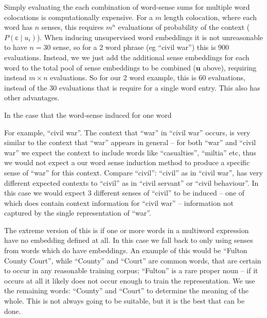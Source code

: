 \documentclass{sig-alternate}
\begin{document}
Simply evaluating the each combination of word-sense sums for multiple word colocations is computationally expensive. For a $m$ length colocation, where each word has $n$ senses, this requires $m^n$ evaluations of probability of the context ($P(\mathbb{c}\mid u_i)$). When inducing unsupervised word embeddings it is not unreasonable to have $n=30$ sense, so for a 2 word phrase (eg ``civil war'') this is 900 evaluations.
Instead, we we just add the additional sense embeddings for each word to the total pool of sense embeddings to be combined ($\mathbf{u}$ above), requiring instead $m \times n$ evaluations. So for our 2 word example, this is 60 evaluations, instead of the 30 evaluations that is require for a single word entry. This also has other advantages.


In the case that the word-sense induced for one word 

For example, ``civil war''. The context that ``war'' in ``civil war'' occurs, is very similar to the context that ``war'' appears in general -- for both ``war'' and ``civil war'' we expect the context to include words like ``casualties'', ``miltia'' etc, thus we would not expect a our word sense induction method to produce a specific sense of ``war'' for this context.
Compare ``civil'': ``civil'' as in ``civil war'', has very different expected contexts to ``civil'' as in ``civil servant'' or ``civil behaviour''. In this case we would expect 3 different senses of ``civil'' to be induced -- one of which does contain context information for ``civil war'' -- information not captured by the single representation of ``war''.

The extreme version of this is if one or more words in a multiword expression have no embedding defined at all. In this case we fall back to only using senses from words which do have embeddings. An example of this would be ``Fulton County Court'', while ``County'' and ``Court'' are common words, that are certain to occur in any reasonable training corpus; ``Fulton'' is a rare proper noun -- if it occurs at all it likely does not occur enough to train the representation. We use the remaining words: ``County'' and ``Court'' to determine the meaning of the whole. This is not always going to be suitable, but it is the best that can be done.
\end{document}
